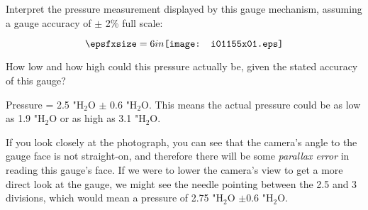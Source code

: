 

Interpret the pressure measurement displayed by this gauge mechanism, assuming a gauge accuracy of $\pm$ 2\% full scale:

$$\epsfxsize=6in \texttt{[image: i01155x01.eps]}$$

How low and how high could this pressure actually be, given the stated accuracy of this gauge?







Pressure = 2.5 "H$_{2}$O $\pm$ 0.6 "H$_{2}$O.  This means the actual pressure could be as low as 1.9 "H$_{2}$O or as high as 3.1 "H$_{2}$O.

 
\vskip 10pt

If you look closely at the photograph, you can see that the camera's angle to the gauge face is not straight-on, and therefore there will be some {\it parallax error} in reading this gauge's face.  If we were to lower the camera's view to get a more direct look at the gauge, we might see the needle pointing between the 2.5 and 3 divisions, which would mean a pressure of 2.75 "H$_{2}$O $\pm$0.6 "H$_{2}$O.











